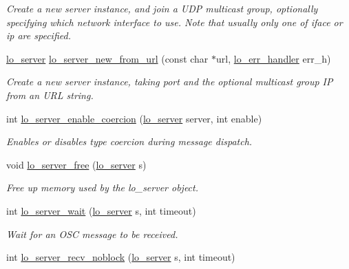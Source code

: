 \begin{DoxyCompactItemize}
\begin{DoxyCompactList}\small\item\em Create a new server instance, and join a U\+D\+P multicast group, optionally specifying which network interface to use. Note that usually only one of iface or ip are specified. \end{DoxyCompactList}\item 
\hyperlink{lo__types_8h_a59067bf50cf8abb4371da6f03c9036c9}{lo\+\_\+server} \hyperlink{group__liblolowlevel_ga1246a1f4a2ba967d31017452a32daf2a}{lo\+\_\+server\+\_\+new\+\_\+from\+\_\+url} (const char $\ast$url, \hyperlink{lo__types_8h_aa5d2e4aa0ff9d4459fcc76e7ed5839fc}{lo\+\_\+err\+\_\+handler} err\+\_\+h)
\begin{DoxyCompactList}\small\item\em Create a new server instance, taking port and the optional multicast group I\+P from an U\+R\+L string. \end{DoxyCompactList}\item 
int \hyperlink{group__liblolowlevel_ga175ef81fc2d695895967bfc30a495b2a}{lo\+\_\+server\+\_\+enable\+\_\+coercion} (\hyperlink{lo__types_8h_a59067bf50cf8abb4371da6f03c9036c9}{lo\+\_\+server} server, int enable)
\begin{DoxyCompactList}\small\item\em Enables or disables type coercion during message dispatch. \end{DoxyCompactList}\item 
void \hyperlink{group__liblolowlevel_gad3dc9193e1eef0d71a4b046242b64216}{lo\+\_\+server\+\_\+free} (\hyperlink{lo__types_8h_a59067bf50cf8abb4371da6f03c9036c9}{lo\+\_\+server} s)
\begin{DoxyCompactList}\small\item\em Free up memory used by the lo\+\_\+server object. \end{DoxyCompactList}\item 
int \hyperlink{group__liblolowlevel_ga33cdcfbab89d58f82175386a76698822}{lo\+\_\+server\+\_\+wait} (\hyperlink{lo__types_8h_a59067bf50cf8abb4371da6f03c9036c9}{lo\+\_\+server} s, int timeout)
\begin{DoxyCompactList}\small\item\em Wait for an O\+S\+C message to be received. \end{DoxyCompactList}\item 
int \hyperlink{group__liblolowlevel_ga784a257252d05cc0e7210f4691f0661b}{lo\+\_\+server\+\_\+recv\+\_\+noblock} (\hyperlink{lo__types_8h_a59067bf50cf8abb4371da6f03c9036c9}{lo\+\_\+server} s, int timeout)

\end{DoxyCompactItemize}
